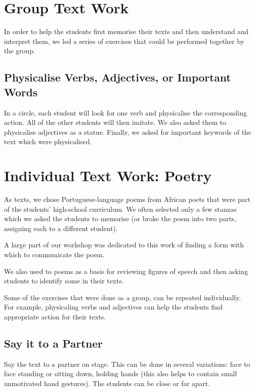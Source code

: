 \documentclass[article,twocolumn,twoside]{memoir}
\begin{document}
\section{Group Text Work}

In order to help the students first memorise their texts and then understand
and interpret them, we led a series of exercises that could be performed
together by the group.

\subsection{Physicalise Verbs, Adjectives, or Important Words}

In a circle, each student will look for one verb and physicalise the
corresponding action. All of the other students will then imitate. We also
asked them to physicalise adjectives as a statue. Finally, we asked for
important keywords of the text which were physicalised.

\section{Individual Text Work: Poetry}

As texts, we chose Portuguese-language poems from African poets that were part
of the students' high-school curriculum. We often selected only a few stanzas
which we asked the students to memorise (or broke the poem into two parts,
assigning each to a different student).

A large part of our workshop was dedicated to this work of finding a form with
which to communicate the poem.

We also used to poems as a basis for reviewing figures of speech and then
asking students to identify some in their texts.

Some of the exercises that were done as a group, can be repeated individually.
For example, physicaling verbs and adjectives can help the students find
appropriate action for their texts.

\subsection{Say it to a Partner}

Say the text to a partner on stage. This can be done in several variations:
face to face standing or sitting down, holding hands (this also helps to
contain small unmotivated hand gestures). The students can be close or far apart.
\end{document}
